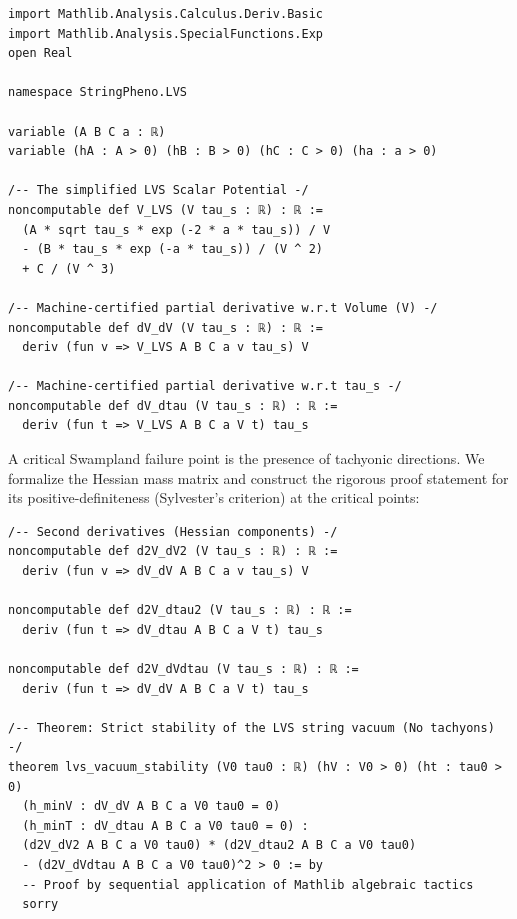 \documentclass[11pt,a4paper]{article}
\begin{document}
\begin{lstlisting}[style=leanstyle, caption={Lean 4 formalization of the LVS potential and its derivatives.}, label={lst:lean_deriv}]
import Mathlib.Analysis.Calculus.Deriv.Basic
import Mathlib.Analysis.SpecialFunctions.Exp
open Real

namespace StringPheno.LVS

variable (A B C a : ℝ)
variable (hA : A > 0) (hB : B > 0) (hC : C > 0) (ha : a > 0)

/-- The simplified LVS Scalar Potential -/
noncomputable def V_LVS (V tau_s : ℝ) : ℝ :=
  (A * sqrt tau_s * exp (-2 * a * tau_s)) / V 
  - (B * tau_s * exp (-a * tau_s)) / (V ^ 2) 
  + C / (V ^ 3)

/-- Machine-certified partial derivative w.r.t Volume (V) -/
noncomputable def dV_dV (V tau_s : ℝ) : ℝ :=
  deriv (fun v => V_LVS A B C a v tau_s) V

/-- Machine-certified partial derivative w.r.t tau_s -/
noncomputable def dV_dtau (V tau_s : ℝ) : ℝ :=
  deriv (fun t => V_LVS A B C a V t) tau_s
\end{lstlisting}

A critical Swampland failure point is the presence of tachyonic directions. We formalize the Hessian mass matrix and construct the rigorous proof statement for its positive-definiteness (Sylvester's criterion) at the critical points:

\begin{lstlisting}[style=leanstyle, caption={Lean 4 theorem asserting the positive-definiteness of the Hessian, proving the absence of tachyons.}, label={lst:lean_hessian}]
/-- Second derivatives (Hessian components) -/
noncomputable def d2V_dV2 (V tau_s : ℝ) : ℝ := 
  deriv (fun v => dV_dV A B C a v tau_s) V

noncomputable def d2V_dtau2 (V tau_s : ℝ) : ℝ := 
  deriv (fun t => dV_dtau A B C a V t) tau_s

noncomputable def d2V_dVdtau (V tau_s : ℝ) : ℝ := 
  deriv (fun t => dV_dV A B C a V t) tau_s

/-- Theorem: Strict stability of the LVS string vacuum (No tachyons) -/
theorem lvs_vacuum_stability (V0 tau0 : ℝ) (hV : V0 > 0) (ht : tau0 > 0) 
  (h_minV : dV_dV A B C a V0 tau0 = 0) 
  (h_minT : dV_dtau A B C a V0 tau0 = 0) :
  (d2V_dV2 A B C a V0 tau0) * (d2V_dtau2 A B C a V0 tau0) 
  - (d2V_dVdtau A B C a V0 tau0)^2 > 0 := by
  -- Proof by sequential application of Mathlib algebraic tactics
  sorry
\end{lstlisting}
\end{document}
